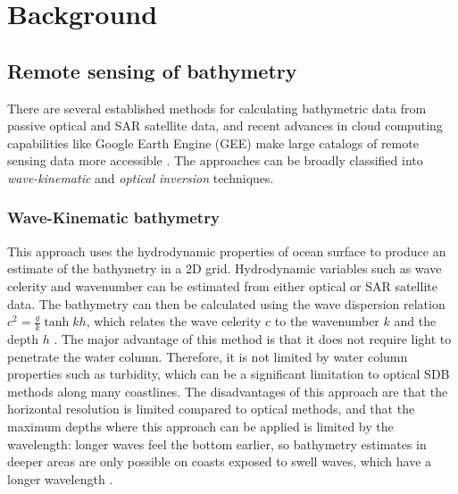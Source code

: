 \chapter{Background}


\section{Remote sensing of bathymetry}
There are several established methods for calculating bathymetric data from passive optical and SAR satellite data, and recent advances in cloud computing capabilities like Google Earth Engine (GEE) \parencite{Gorelick2017a} make large catalogs of remote sensing data more accessible \parencite{Pike2019,Turner2021}. The approaches can be broadly classified into \emph{wave-kinematic} and \emph{optical inversion} techniques.

\subsection{Wave-Kinematic bathymetry}
This approach uses the hydrodynamic properties of ocean surface to produce an estimate of the bathymetry in a 2D grid. Hydrodynamic variables such as wave celerity and wavenumber can be estimated from either optical or SAR satellite data. The bathymetry can then be calculated using the wave dispersion relation $c^2 = \frac{g}{k}\tanh{kh}$, which relates the wave celerity $c$ to the wavenumber $k$ and the depth $h$ \parencite{Almar2021e}. The major advantage of this method is that it does not require light to penetrate the water column. Therefore, it is not limited by water column properties such as turbidity, which can be a significant limitation to optical SDB methods along many coastlines. The disadvantages of this approach are that the horizontal resolution is limited compared to optical methods, and that the maximum depths where this approach can be applied is limited by the wavelength: longer waves feel the bottom earlier, so bathymetry estimates in deeper areas are only possible on coasts exposed to swell waves, which have a longer wavelength \parencite{Almar2021e}.

